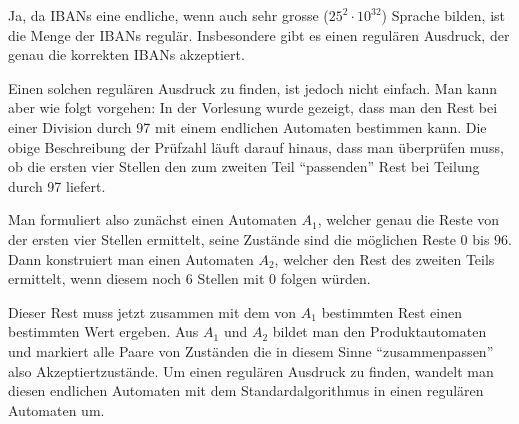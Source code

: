 \begin{loesung}
Ja, da IBANs eine endliche, wenn auch sehr grosse ($25^2\cdot 10^{32}$)
Sprache bilden, ist die Menge der IBANs regulär.
Insbesondere gibt es einen regulären Ausdruck, der genau die 
korrekten IBANs akzeptiert.

Einen solchen regulären Ausdruck zu finden, ist jedoch nicht einfach.
Man kann aber wie folgt vorgehen: In der Vorlesung wurde gezeigt,
dass man den Rest bei einer Division durch 97 mit einem endlichen
Automaten bestimmen kann. Die obige Beschreibung der Prüfzahl
läuft darauf hinaus, dass man überprüfen muss, ob die ersten
vier Stellen den zum zweiten Teil ``passenden'' Rest bei Teilung
durch 97 liefert.

Man formuliert also zunächst einen Automaten $A_1$,
welcher genau die Reste von der ersten vier Stellen ermittelt, seine
Zustände sind die möglichen Reste $0$ bis $96$.
Dann konstruiert man einen Automaten $A_2$, welcher den Rest 
des zweiten Teils ermittelt, wenn diesem noch 6 Stellen mit $0$
folgen würden.

Dieser Rest muss jetzt zusammen mit dem von $A_1$
bestimmten Rest einen bestimmten Wert ergeben. Aus $A_1$ und $A_2$ bildet
man den Produktautomaten und markiert alle Paare von Zuständen die
in diesem Sinne ``zusammenpassen'' also Akzeptiertzustände.
Um einen regulären Ausdruck zu finden, wandelt man diesen endlichen
Automaten mit dem Standardalgorithmus in einen regulären Automaten
um.
\end{loesung}
